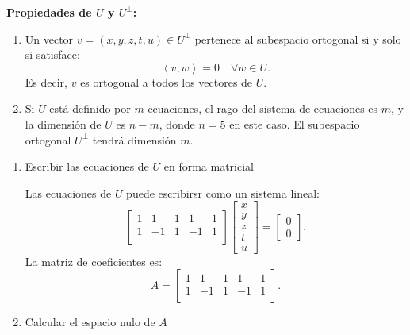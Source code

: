 \begin{enumerate}[label=\color{red}\textbf{\arabic*)}]
        \textbf{Propiedades de $U$ y $U^\perp$:}
        \begin{enumerate}[label=\arabic*)]
            \item Un vector $v=(x,y,z,t,u)\in U^\perp$ pertenece al subespacio ortogonal si y solo si satisface: \[
            \left<v,w \right> = 0\quad \forall w\in U.
            \] 
            Es decir, $v$ es ortogonal a todos los vectores de $U$.
        \item Si $U$ está definido por $m$ ecuaciones, el rago del sistema de ecuaciones es $m$, y la dimensión de $U$ es $n-m$, donde  $n=5$ en este caso. El subespacio ortogonal  $U^\perp$ tendrá dimensión  $m$.
        \end{enumerate}
        \begin{enumerate}[label=Paso \arabic*:]
            \item Escribir las ecuaciones de $U$ en forma matricial

                Las ecuaciones de $U$ puede escribirsr como un sistema lineal: \[
                \begin{bmatrix} 
                    1 & 1 & 1 & 1 & 1\\ 
                    1 & -1 & 1 & -1 & 1\\ 
                \end{bmatrix} \begin{bmatrix} 
                x\\
                y\\
                z\\
                t\\
                u
                \end{bmatrix} =\begin{bmatrix} 
                0\\ 0 
                \end{bmatrix} .
                \] 
                La matriz de coeficientes es: \[
                A=\begin{bmatrix} 
                    1 & 1 & 1 & 1 & 1\\ 
                    1 & -1 & 1 & -1 & 1\\ 
                \end{bmatrix} .
                \] 
            \item Calcular el espacio nulo de $A$


\end{enumerate}
\end{enumerate}
